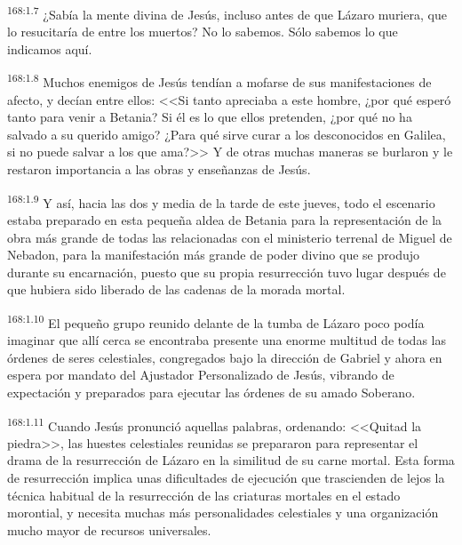 \par 
\textsuperscript{168:1.7} ¿Sabía la mente divina de Jesús, incluso antes de que Lázaro muriera, que lo resucitaría de entre los muertos? No lo sabemos. Sólo sabemos lo que indicamos aquí.

\par 
\textsuperscript{168:1.8} Muchos enemigos de Jesús tendían a mofarse de sus manifestaciones de afecto, y decían entre ellos: <<Si tanto apreciaba a este hombre, ¿por qué esperó tanto para venir a Betania? Si él es lo que ellos pretenden, ¿por qué no ha salvado a su querido amigo? ¿Para qué sirve curar a los desconocidos en Galilea, si no puede salvar a los que ama?>> Y de otras muchas maneras se burlaron y le restaron importancia a las obras y enseñanzas de Jesús.

\par 
\textsuperscript{168:1.9} Y así, hacia las dos y media de la tarde de este jueves, todo el escenario estaba preparado en esta pequeña aldea de Betania para la representación de la obra más grande de todas las relacionadas con el ministerio terrenal de Miguel de Nebadon, para la manifestación más grande de poder divino que se produjo durante su encarnación, puesto que su propia resurrección tuvo lugar después de que hubiera sido liberado de las cadenas de la morada mortal.

\par 
\textsuperscript{168:1.10} El pequeño grupo reunido delante de la tumba de Lázaro poco podía imaginar que allí cerca se encontraba presente una enorme multitud de todas las órdenes de seres celestiales, congregados bajo la dirección de Gabriel y ahora en espera por mandato del Ajustador Personalizado de Jesús, vibrando de expectación y preparados para ejecutar las órdenes de su amado Soberano.

\par 
\textsuperscript{168:1.11} Cuando Jesús pronunció aquellas palabras, ordenando: <<Quitad la piedra>>, las huestes celestiales reunidas se prepararon para representar el drama de la resurrección de Lázaro en la similitud de su carne mortal. Esta forma de resurrección implica unas dificultades de ejecución que trascienden de lejos la técnica habitual de la resurrección de las criaturas mortales en el estado morontial, y necesita muchas más personalidades celestiales y una organización mucho mayor de recursos universales.

